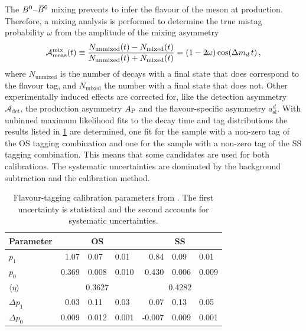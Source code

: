 The ${{B}^0}$--${{\kern 0.18em\overline{\kern -0.18em B}{}}{}^0}$ mixing prevents to infer the flavour of the \Bd meson at
production. Therefore, a mixing analysis is performed to determine the true
mistag probability $\omega$ from the amplitude of the mixing asymmetry
\begin{equation}
\mathcal{A}^{\text{mix}}_{\text{meas}} (t) \equiv \frac{N_{\text{unmixed}}(t) - N_{\text{mixed}}(t)}{N_{\text{unmixed}}(t) + N_{\text{mixed}}(t)}
 =(1-2\omega) \cos({\Delta m_{{d}}}\,t) \,,
\label{eq:dataanalysis:taggingcalibration:dsdcalibration:asymmetry}
\end{equation}
where $N_{\text{unmixed}}$ is the number of \BdToDsD decays with a final state
that does correspond to the flavour tag, and $N_{\text{mixed}}$ the number
with a final state that does not. Other experimentally induced effects are
corrected for, like the detection asymmetry $\mathcal{A}_{\mathrm{det}}$, the
production asymmetry $A_{\mathrm{P}}$ and the flavour-specific asymmetry
$a_{\mathrm{sl}}^d$. With unbinned maximum likelihood fits to the decay time
and tag distributions the results listed in
\cref{tab:dataanalysis:taggingcalibration:dsdcalibration} are determined, one
fit for the sample with a non-zero tag of the OS tagging combination and one
for the sample with a non-zero tag of the SS tagging combination. This means
that some candidates are used for both calibrations. The systematic
uncertainties are dominated by the background subtraction and the calibration
method.

\begin{table}[htb]
\caption{Flavour-tagging calibration parameters from \BdToDsD. The first
uncertainty is statistical and the second accounts for systematic
uncertainties.}
\label{tab:dataanalysis:taggingcalibration:dsdcalibration}
\centering
\begin{tabular}{lr@{$\,\pm\,$}l@{$\,\pm\,$}lr@{$\,\pm\,$}l@{$\,\pm\,$}l}
  \toprule
  Parameter             & \multicolumn{3}{c}{OS} & \multicolumn{3}{c}{SS} \\
  \midrule
  $p_{1}$               & 1.07  & 0.07  & 0.01  & 0.84  & 0.09  & 0.01  \\
  $p_{0}$               & 0.369 & 0.008 & 0.010 & 0.430 & 0.006 & 0.009 \\
  $\langle \eta\rangle$ & \multicolumn{3}{c}{0.3627} & \multicolumn{3}{c}{0.4282} \\
  $\Delta p_{1}$        & 0.03  & 0.11  & 0.03  & 0.07   & 0.13  & 0.05  \\
  $\Delta p_{0}$        & 0.009 & 0.012 & 0.001 & -0.007 & 0.009 & 0.001 \\
  \bottomrule
\end{tabular}
\end{table}

